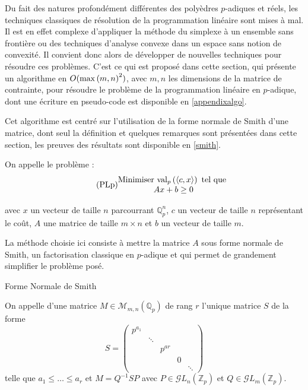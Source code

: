 	Du fait des natures profondément différentes des polyèdres $p$-adiques et réels, les techniques classiques de résolution de la programmation linéaire sont mises à mal. Il est en effet complexe d'appliquer la méthode du simplexe à un ensemble sans frontière ou des techniques d'analyse convexe dans un espace sans notion de convexité. Il convient donc alors de développer de nouvelles techniques pour résoudre ces problèmes. C'est ce qui est proposé dans cette section, qui présente un algorithme en $O( \max\left( m,n \right)^2 )$, avec $m,n$ les dimensions de la matrice de contrainte, pour résoudre le problème de la programmation linéaire en $p$-adique, dont une écriture en pseudo-code \iffalse ainsi qu'une implémentation en \sage  sont \fi est disponible en \ref{appendixalgo}.

Cet algorithme est centré sur l'utilisation de la forme normale de Smith d'une matrice, dont seul la définition et quelques remarques sont présentées dans cette section, les preuves des résultats sont disponible en \ref{smith}.

	On appelle  le problème :
\begin{equation}
	  \tag{PLp}
\begin{matrix}
	\text{Minimiser } \text{val}_p\left(\left<c,x \right>\right) \text{ tel que }\\
	Ax + b \ge 0
 \end{matrix}
	    \label{eqn:Proglinp}
\end{equation}

avec $x$ un vecteur de taille $n$ parcourrant $\mathbb{Q}_{p} ^n$, $c$ un vecteur de taille $n$ représentant le coût, $A$ une matrice de taille $m \times n $ et $b$ un vecteur de taille $m$.

La méthode choisie ici consiste à mettre la matrice $A$ sous forme normale de Smith, un factorisation classique en $p$-adique et qui permet de grandement simplifier le problème posé.

\begin{definition}
	Forme Normale de Smith

	On appelle  d'une matrice $M \in \mathcal{M}_{m,n}\left(\mathbb{Q}_{p} \right) $ de rang $r$ l'unique matrice $S$ de la forme $$S =  
	\begin{pmatrix} p^{a_1} & \\
		 & \ddots \\
		 & & p^{ar}\\
		 & & & 0\\
		 & & & & \ddots \end{pmatrix} $$
		 telle que $a_1\le  \ldots\le a_r$ et $M =  Q^{-1} S P$ avec $P \in \mathcal{G}L_n\left( \mathbb{Z}_p \right) $ et $Q \in \mathcal{G}L_m\left( \mathbb{Z}_p \right) $.
\end{definition}

